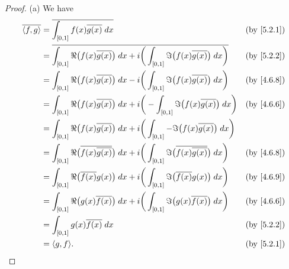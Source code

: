 \begin{proof}{(a)}
  We have
  \begin{align*}
    \overline{\inner*{f, g}} & = \overline{\int_{[0, 1]} f(x) \overline{g(x)} \; dx}                                                                                               & \text{(by \cref{5.2.1})} \\
                             & = \overline{\int_{[0, 1]} \Re\big(f(x) \overline{g(x)}\big) \; dx + i \bigg(\int_{[0, 1]} \Im\big(f(x) \overline{g(x)}\big) \; dx\bigg)}            & \text{(by \cref{5.2.2})} \\
                             & = \int_{[0, 1]} \Re\big(f(x) \overline{g(x)}\big) \; dx - i \bigg(\int_{[0, 1]} \Im\big(f(x) \overline{g(x)}\big) \; dx\bigg)                       & \text{(by \cref{4.6.8})} \\
                             & = \int_{[0, 1]} \Re\big(f(x) \overline{g(x)}\big) \; dx + i \bigg(-\int_{[0, 1]} \Im\big(f(x) \overline{g(x)}\big) \; dx\bigg)                      & \text{(by \cref{4.6.6})} \\
                             & = \int_{[0, 1]} \Re\big(f(x) \overline{g(x)}\big) \; dx + i \bigg(\int_{[0, 1]} -\Im\big(f(x) \overline{g(x)}\big) \; dx\bigg)                                                 \\
                             & = \int_{[0, 1]} \Re\big(\overline{f(x) \overline{g(x)}}\big) \; dx + i \bigg(\int_{[0, 1]} \Im\big(\overline{f(x) \overline{g(x)}}\big) \; dx\bigg) & \text{(by \cref{4.6.8})} \\
                             & = \int_{[0, 1]} \Re\big(\overline{f(x)} g(x)\big) \; dx + i \bigg(\int_{[0, 1]} \Im\big(\overline{f(x)} g(x)\big) \; dx\bigg)                       & \text{(by \cref{4.6.9})} \\
                             & = \int_{[0, 1]} \Re\big(g(x) \overline{f(x)}\big) \; dx + i \bigg(\int_{[0, 1]} \Im\big(g(x) \overline{f(x)}\big) \; dx\bigg)                       & \text{(by \cref{4.6.6})} \\
                             & = \int_{[0, 1]} g(x) \overline{f(x)} \; dx                                                                                                          & \text{(by \cref{5.2.2})} \\
                             & = \inner*{g, f}.                                                                                                                                    & \text{(by \cref{5.2.1})}
  \end{align*}
\end{proof}

